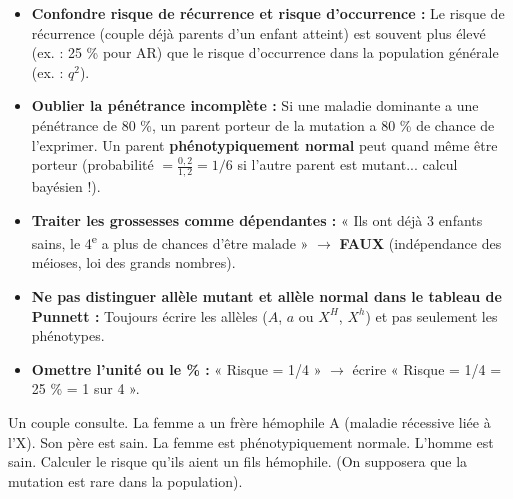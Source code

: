 \documentclass[11pt]{article}
\begin{document}
\begin{attention}
\begin{itemize}
    \item \textbf{Confondre risque de récurrence et risque d'occurrence :} Le risque de récurrence (couple déjà parents d'un enfant atteint) est souvent plus élevé (ex. : 25 \% pour AR) que le risque d'occurrence dans la population générale (ex. : $q^2$).
    \item \textbf{Oublier la pénétrance incomplète :} Si une maladie dominante a une pénétrance de 80 \%, un parent porteur de la mutation a 80 \% de chance de l'exprimer. Un parent \textbf{phénotypiquement normal} peut quand même être porteur (probabilité $= \frac{0,2}{1,2} = 1/6$ si l'autre parent est mutant... calcul bayésien !).
    \item \textbf{Traiter les grossesses comme dépendantes :} « Ils ont déjà 3 enfants sains, le 4\textsuperscript{e} a plus de chances d'être malade » $\to$ \textbf{FAUX} (indépendance des méioses, loi des grands nombres).
    \item \textbf{Ne pas distinguer allèle mutant et allèle normal dans le tableau de Punnett :} Toujours écrire les allèles ($A$, $a$ ou $X^H$, $X^h$) et pas seulement les phénotypes.
    \item \textbf{Omettre l'unité ou le \% :} « Risque = 1/4 » $\to$ écrire « Risque = 1/4 = 25 \% = 1 sur 4 ».
\end{itemize}
\end{attention}

\begin{exercice}
Un couple consulte. La femme a un frère hémophile A (maladie récessive liée à l'X). Son père est sain. La femme est phénotypiquement normale. L'homme est sain. Calculer le risque qu'ils aient un fils hémophile. (On supposera que la mutation est rare dans la population).
\end{exercice}
\end{document}
